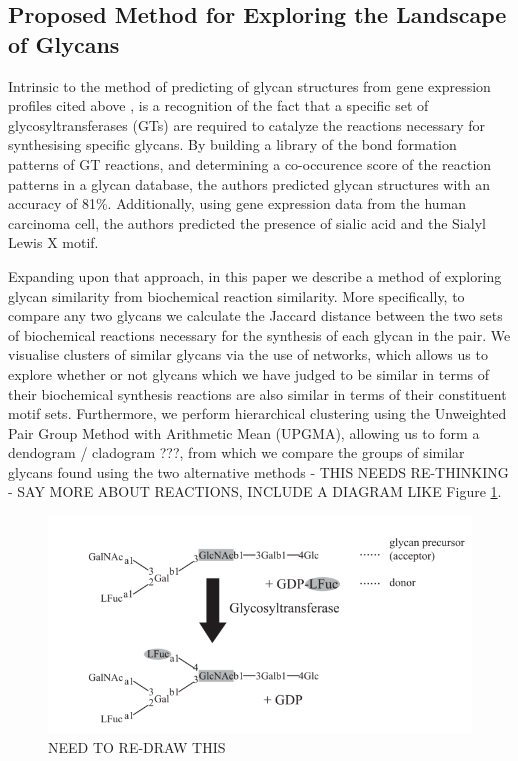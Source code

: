 \documentclass[12pt,a4paper]{article}
\begin{document}
\subsection{Proposed Method for Exploring the Landscape of Glycans}
\label{sec:proposed_method}
Intrinsic to the method of predicting of glycan structures from gene expression profiles cited above \citep{doi:10.1093/bioinformatics/bti666}, is a recognition of the fact that a specific set of glycosyltransferases (GTs) are required to catalyze the reactions necessary for synthesising specific glycans. By building a library of the bond formation patterns of GT reactions, and determining a co-occurence score of the reaction patterns in a glycan database, the authors predicted glycan structures with an accuracy of 81\%. Additionally, using gene expression data from the human carcinoma cell, the authors predicted the presence of sialic acid and the Sialyl Lewis X motif.

Expanding upon that approach, in this paper we describe a method of exploring glycan similarity from biochemical reaction similarity. More specifically, to compare any two glycans we calculate the Jaccard distance between the two sets of biochemical reactions necessary for the synthesis of each glycan in the pair. We visualise clusters of similar glycans via the use of networks, which allows us to explore whether or not glycans which we have judged to be similar in terms of their biochemical synthesis reactions are also similar in terms of their constituent motif sets. Furthermore, we perform hierarchical clustering using the Unweighted Pair Group Method with Arithmetic Mean (UPGMA), allowing us to form a dendogram / cladogram ???, from which we compare the groups of similar glycans found using the two alternative methods - THIS NEEDS RE-THINKING - SAY MORE ABOUT REACTIONS, INCLUDE A DIAGRAM LIKE Figure \ref{fig:gt_reaction_pattern}.

\begin{figure}[H]
\centering 
\includegraphics[scale=0.8]{images/gt_reaction_pattern.png} 
\caption{NEED TO RE-DRAW THIS}
\label{fig:gt_reaction_pattern}
\end{figure}
\end{document}
